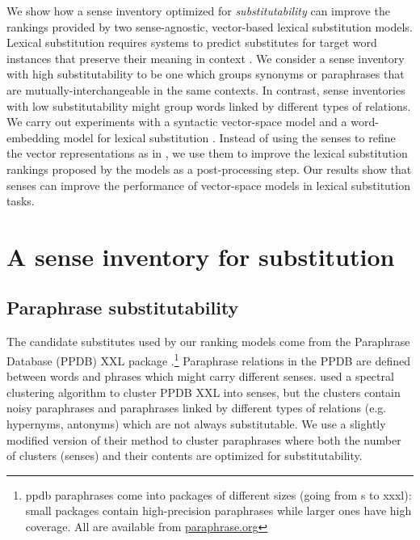 \documentclass[11pt]{article}
\begin{document}
	We show how a sense inventory optimized for \textit{substitutability} can improve the rankings provided by two sense-agnostic, vector-based lexical substitution models. 
	Lexical substitution requires systems to predict substitutes for target word instances that preserve their meaning in context \cite{mccarthy-navigli:07}. We consider a sense inventory with high substitutability to be one which groups synonyms or paraphrases that are mutually-interchangeable in the same contexts. In contrast, sense inventories with low substitutability might group words linked by different types of relations. 
	We carry out experiments with a syntactic vector-space model \cite{thater-furstenau-pinkal:2011:IJCNLP-2011,apidianaki:2016:EMNLP2016} and a word-embedding model for lexical substitution \cite{melamud-levy-dagan:2015:VSM-NLP}. Instead of using the senses to refine the vector representations as in \cite{faruqui-EtAl:2015:NAACL-HLT}, we use them to improve the lexical substitution rankings proposed by the models as a post-processing step. Our results show that senses can improve the performance of vector-space models in lexical substitution tasks.
	
	
	\section{A sense inventory for substitution}
	
	\subsection{Paraphrase substitutability}
	
	The candidate substitutes used by our ranking models come from the Paraphrase Database (PPDB) XXL package \cite{ganitkevitch-EtAl:2013:NAACL}.\footnote{{\sc ppdb} paraphrases come into packages of different sizes (going from {\sc s} to {\sc xxxl}): small packages contain high-precision paraphrases while larger ones have high coverage. All are available from \url{paraphrase.org}} Paraphrase relations in the PPDB are defined between words and phrases which might carry different senses.  used a spectral clustering algorithm to cluster PPDB XXL into senses, but 
	the clusters contain noisy paraphrases and paraphrases linked by different types of relations (e.g. hypernyms, antonyms) which are not always substitutable. We use a slightly modified version of their method to cluster paraphrases where both the number of clusters (senses) and their contents are optimized for substitutability. 
	
\end{document}
